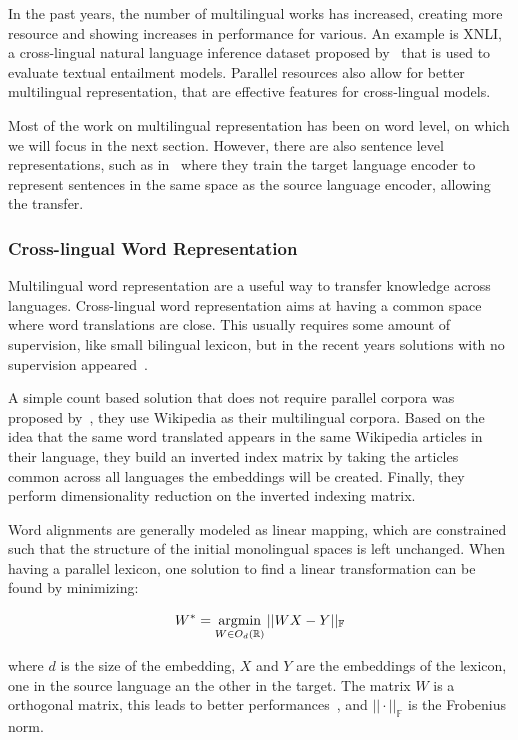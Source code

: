 In the past years, the number of multilingual works has increased, creating more resource and showing increases in performance for various. An example is XNLI, a cross-lingual natural language inference dataset proposed by~\cite{conneau2018xnli} that is used to evaluate textual entailment models. Parallel resources also allow for better multilingual representation, that are effective features for cross-lingual models.

Most of the work on multilingual representation has been on word level, on which we will focus in the next section. However, there are also sentence level representations, such as in~\citep{conneau2018xnli} where they train the target language encoder to represent sentences in the same space as the source language encoder, allowing the transfer.   

\subsubsection{Cross-lingual Word Representation}

Multilingual word representation are a useful way to transfer knowledge across languages. Cross-lingual word representation aims at having a common space where word translations are close. This usually requires some amount of supervision, like small bilingual lexicon, but in the recent years solutions with no supervision appeared~\citep{lample2018translation}.

A simple count based solution that does not require parallel corpora was proposed by~\cite{sogaard2015inverted}, they use Wikipedia as their multilingual corpora. Based on the idea that the same word translated appears in the same Wikipedia articles in their language, they build an inverted index matrix by taking the articles common across all languages the embeddings will be created. Finally, they perform dimensionality reduction on the inverted indexing matrix.

Word alignments are generally modeled as linear mapping, which are constrained such that the structure of the initial monolingual spaces is left unchanged. When having a parallel lexicon, one solution to find a linear transformation can be found by minimizing:

\begin{equation}
    W^* = \argmin_{W \in O_d(\mathbb{R})} ||WX-Y||_\mathbb{F} %
\end{equation}

where $d$ is the size of the embedding, $X$ and $Y$ are the embeddings of the lexicon, one in the source language an the other in the target. The matrix $W$ is a orthogonal matrix, this leads to better performances~\cite{xing-etal-2015-normalized}, and $||\cdot||_{\mathbb{F}}$ is the Frobenius norm.


